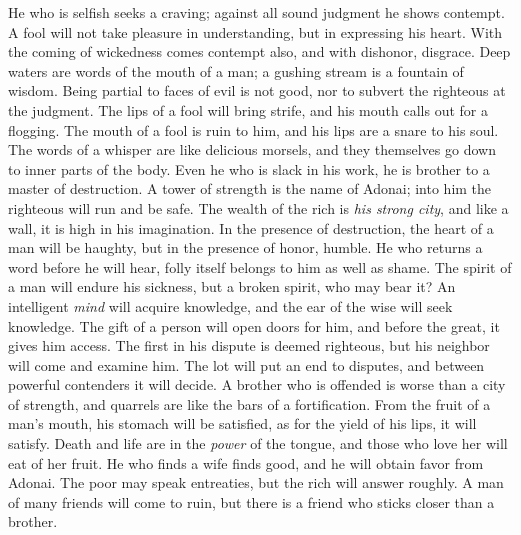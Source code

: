 \begin{biblechapter} %
\verse He who is selfish seeks a craving; 
against all sound judgment he shows contempt.
\verse A fool will not take pleasure in understanding, 
but in expressing his heart.
\verse With the coming of wickedness comes contempt also, 
and with dishonor, disgrace.
\verse Deep waters are words of the mouth of a man; 
a gushing stream is a fountain of wisdom.
\verse Being partial to faces of evil is not good, 
nor to subvert the righteous at the judgment.
\verse The lips of a fool will bring strife, 
and his mouth calls out for a flogging.
\verse The mouth of a fool is ruin to him, 
and his lips are a snare to his soul.
\verse The words of a whisper are like delicious morsels, 
and they themselves go down to inner parts of the body.
\verse Even he who is slack in his work, 
he is brother to a master of destruction.
\verse A tower of strength is the name of Adonai; 
into him the righteous will run and be safe.
\verse The wealth of the rich is \textit{his strong city}, 
and like a wall, it is high in his imagination.
\verse In the presence of destruction, the heart of a man will be haughty, 
but in the presence of honor, humble.
\verse He who returns a word before he will hear, 
folly itself belongs to him as well as shame.
\verse The spirit of a man will endure his sickness, 
but a broken spirit, who may bear it?
\verse An intelligent \textit{mind} will acquire knowledge, 
and the ear of the wise will seek knowledge.
\verse The gift of a person will open doors for him, 
and before the great, it gives him access.
\verse The first in his dispute is deemed righteous, 
but his neighbor will come and examine him.
\verse The lot will put an end to disputes, 
and between powerful contenders it will decide.
\verse A brother who is offended is worse than a city of strength, 
and quarrels are like the bars of a fortification.
\verse From the fruit of a man’s mouth, his stomach will be satisfied, 
as for the yield of his lips, it will satisfy.
\verse Death and life are in the \textit{power} of the tongue, 
and those who love her will eat of her fruit.
\verse He who finds a wife finds good, 
and he will obtain favor from Adonai.
\verse The poor may speak entreaties, 
but the rich will answer roughly.
\verse A man of many friends will come to ruin, 
but there is a friend who sticks closer than a brother.
\end{biblechapter}

